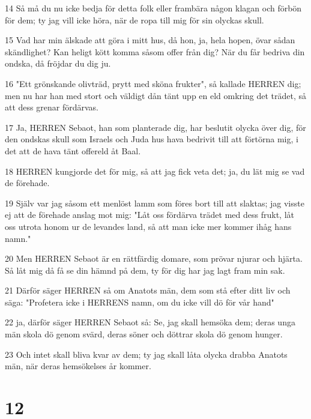 \par 14 Så må du nu icke bedja för detta folk eller frambära någon klagan och förbön för dem; ty jag vill icke höra, när de ropa till mig för sin olyckas skull.
\par 15 Vad har min älskade att göra i mitt hus, då hon, ja, hela hopen, övar sådan skändlighet? Kan heligt kött komma såsom offer från dig? När du får bedriva din ondska, då fröjdar du dig ju.
\par 16 "Ett grönskande olivträd, prytt med sköna frukter", så kallade HERREN dig; men nu har han med stort och väldigt dån tänt upp en eld omkring det trädet, så att dess grenar fördärvas.
\par 17 Ja, HERREN Sebaot, han som planterade dig, har beslutit olycka över dig, för den ondskas skull som Israels och Juda hus hava bedrivit till att förtörna mig, i det att de hava tänt offereld åt Baal.
\par 18 HERREN kungjorde det för mig, så att jag fick veta det; ja, du lät mig se vad de förehade.
\par 19 Själv var jag såsom ett menlöst lamm som föres bort till att slaktas; jag visste ej att de förehade anslag mot mig: "Låt oss fördärva trädet med dess frukt, låt oss utrota honom ur de levandes land, så att man icke mer kommer ihåg hans namn."
\par 20 Men HERREN Sebaot är en rättfärdig domare, som prövar njurar och hjärta. Så låt mig då få se din hämnd på dem, ty för dig har jag lagt fram min sak.
\par 21 Därför säger HERREN så om Anatots män, dem som stå efter ditt liv och säga: "Profetera icke i HERRENS namn, om du icke vill dö för vår hand"
\par 22 ja, därför säger HERREN Sebaot så: Se, jag skall hemsöka dem; deras unga män skola dö genom svärd, deras söner och döttrar skola dö genom hunger.
\par 23 Och intet skall bliva kvar av dem; ty jag skall låta olycka drabba Anatots män, när deras hemsökelses år kommer.

\chapter{12}

